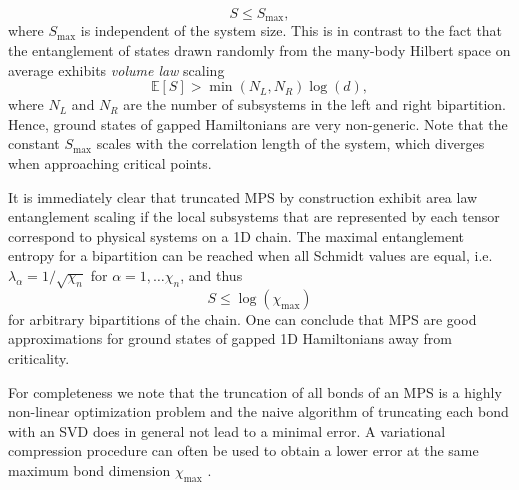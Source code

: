 \begin{equation}
	S \le S_\text{max}, 
\end{equation}
where $S_\text{max}$ is independent of the system size. This is in contrast to the fact that the entanglement of states drawn randomly from the many-body Hilbert space on average exhibits \textit{volume law} scaling
\begin{equation}
	\mathbb{E}\left[S\right] > \min\left(N_L, N_R\right)\log(d),
\end{equation}
where $N_L$ and $N_R$ are the number of subsystems in the left and right bipartition. Hence, ground states of gapped Hamiltonians are very non-generic. Note that the constant $S_\text{max}$ scales with the correlation length of the system, which diverges when approaching critical points. \par
It is immediately clear that truncated MPS by construction exhibit area law entanglement scaling if the local subsystems that are represented by each tensor correspond to physical systems on a 1D chain. The maximal entanglement entropy for a bipartition can be reached when all Schmidt values are equal, i.e. $\lambda_\alpha = 1/\sqrt{\chi_n}$ for $\alpha = 1,\dots\chi_n$, and thus
\begin{equation}
	S \le \log\left(\chi_\text{max}\right)
\end{equation}
for arbitrary bipartitions of the chain. One can conclude that MPS are good approximations for ground states of gapped 1D Hamiltonians away from criticality. \par 
For completeness we note that the truncation of all bonds of an MPS is a highly non-linear optimization problem and the naive algorithm of truncating each bond with an SVD does in general not lead to a minimal error. A variational compression procedure can often be used to obtain a lower error at the same maximum bond dimension $\chi_\text{max}$ \cite{cite:DMRG_in_the_age_of_MPS}. \par

